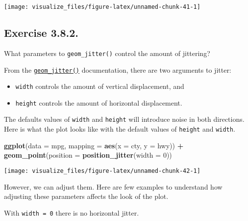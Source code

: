 \documentclass[]{book}
\newenvironment{Shaded}{\begin{snugshade}}{\end{snugshade}}
\newcommand{\DataTypeTok}[1]{\textcolor[rgb]{0.13,0.29,0.53}{#1}}
\newcommand{\DecValTok}[1]{\textcolor[rgb]{0.00,0.00,0.81}{#1}}
\newcommand{\KeywordTok}[1]{\textcolor[rgb]{0.13,0.29,0.53}{\textbf{#1}}}
\newcommand{\NormalTok}[1]{#1}
\newcommand{\OperatorTok}[1]{\textcolor[rgb]{0.81,0.36,0.00}{\textbf{#1}}}
\newcommand{\StringTok}[1]{\textcolor[rgb]{0.31,0.60,0.02}{#1}}
\providecommand{\tightlist}{%
  \setlength{\itemsep}{0pt}\setlength{\parskip}{0pt}}
\theoremstyle{plain}
\theoremstyle{remark}
\begin{document}
\begin{center}\texttt{[image: visualize\_files/figure-latex/unnamed-chunk-41-1]} \end{center}

\hypertarget{exercise-3.8.2.}{%
\subsection*{\texorpdfstring{Exercise
{3.8.2}.}{Exercise 3.8.2.}}\label{exercise-3.8.2.}}

What parameters to \texttt{geom\_jitter()} control the amount of
jittering?

From the
\href{https://ggplot2.tidyverse.org/reference/geom_jitter.html}{\texttt{geom\_jitter()}}
documentation, there are two arguments to jitter:

\begin{itemize}
\tightlist
\item
  \texttt{width} controls the amount of vertical displacement, and
\item
  \texttt{height} controls the amount of horizontal displacement.
\end{itemize}

The defaults values of \texttt{width} and \texttt{height} will introduce
noise in both directions. Here is what the plot looks like with the
default values of \texttt{height} and \texttt{width}.

\begin{Shaded}
\begin{Highlighting}[]
\KeywordTok{ggplot}\NormalTok{(}\DataTypeTok{data =}\NormalTok{ mpg, }\DataTypeTok{mapping =} \KeywordTok{aes}\NormalTok{(}\DataTypeTok{x =}\NormalTok{ cty, }\DataTypeTok{y =}\NormalTok{ hwy)) }\OperatorTok{+}
\StringTok{  }\KeywordTok{geom_point}\NormalTok{(}\DataTypeTok{position =} \KeywordTok{position_jitter}\NormalTok{(}\DataTypeTok{width =} \DecValTok{0}\NormalTok{))}
\end{Highlighting}
\end{Shaded}

\begin{center}\texttt{[image: visualize\_files/figure-latex/unnamed-chunk-42-1]} \end{center}

However, we can adjust them. Here are few examples to understand how
adjusting these parameters affects the look of the plot.

With \texttt{width\ =\ 0} there is no horizontal jitter.
\end{document}
